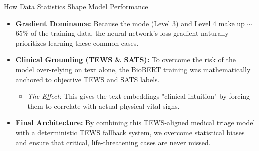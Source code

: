 \documentclass[10pt,aspectratio=169]{beamer}
\begin{document}
\begin{frame}{How Data Statistics Shape Model Performance}
	\begin{itemize}
		\item \textbf{Gradient Dominance:} Because the mode (Level 3) and Level 4 make up $\sim$65\% of the training data, the neural network's loss gradient naturally prioritizes learning these common cases.
		\item \textbf{Clinical Grounding (TEWS \& SATS):} To overcome the risk of the model over-relying on text alone, the BioBERT training was mathematically anchored to objective TEWS and SATS labels.
		\begin{itemize}
			\item \textit{The Effect:} This gives the text embeddings "clinical intuition" by forcing them to correlate with actual physical vital signs.
		\end{itemize}
		\item \textbf{Final Architecture:} By combining this TEWS-aligned medical triage model with a deterministic TEWS fallback system, we overcome statistical biases and ensure that critical, life-threatening cases are never missed.
	\end{itemize}
\end{frame}
	
\end{document}
